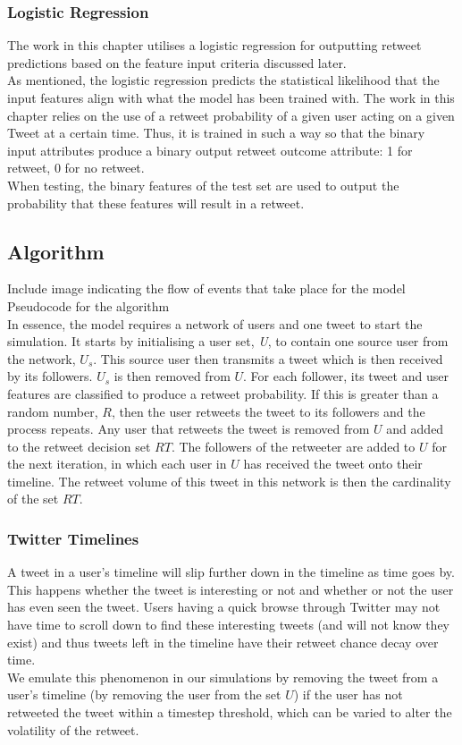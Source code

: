 \subsubsection{Logistic Regression} 
The work in this chapter utilises a logistic regression for outputting retweet predictions based on the feature input criteria discussed later.
\\
As mentioned, the logistic regression predicts the statistical likelihood that the input features align with what the model has been trained with. The work in this chapter relies on the use of a retweet probability of a given user acting on a given Tweet at a certain time. Thus, it is trained in such a way so that the binary input attributes produce a binary output retweet outcome attribute: 1 for retweet, 0 for no retweet.
\\
When testing, the binary features of the test set are used to output the probability that these features will result in a retweet.

\subsection{Algorithm}
Include image indicating the flow of events that take place for the model
\\
Pseudocode for the algorithm
\\
In essence, the model requires a network of users and one tweet to start the simulation. It starts by initialising a user set, \textit{U}, to contain one source user from the network, $U_s$. This source user then transmits a tweet which is then received by its followers. $U_s$ is then removed from $U$. For each follower, its tweet and user features are classified to produce a retweet probability. If this is greater than a random number, $R$, then the user retweets the tweet to its followers and the process repeats. Any user that retweets the tweet is removed from $U$ and added to the retweet decision set $RT$. The followers of the retweeter are added to $U$ for the next iteration, in which each user in $U$ has received the tweet onto their timeline. The retweet volume of this tweet in this network is then the cardinality of the set $RT$.

\subsubsection{Twitter Timelines}
A tweet in a user's timeline will slip further down in the timeline as time goes by. This happens whether the tweet is interesting or not and whether or not the user has even seen the tweet.  Users having a quick browse through Twitter may not have time to scroll down to find these interesting tweets (and will not know they exist) and thus tweets left in the timeline have their retweet chance decay over time.
\\
We emulate this phenomenon in our simulations by removing the tweet from a user's timeline (by removing the user from the set $U$) if the user has not retweeted the tweet within a timestep threshold, which can be varied to alter the volatility of the retweet.

